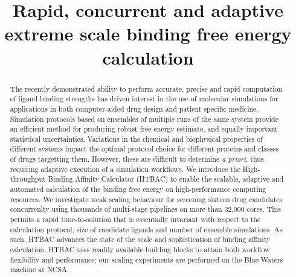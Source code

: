 \documentclass{llncs}
\title{Rapid, concurrent and adaptive extreme scale binding free energy calculation}
\begin{document}
\maketitle





\begin{abstract}

The recently demonstrated ability to perform accurate, precise and rapid
computation of ligand binding strengths has driven interest in the use of
molecular simulations for applications in both computer-aided drug design and
patient specific medicine. Simulation protocols based on ensembles of multiple
runs of the same system provide an efficient method for producing robust free
energy estimate, and equally important statistical uncertainties. Variations
in the chemical and biophysical properties of different systems impact the
optimal protocol choice for different proteins and classes of drugs targetting
them. However, these are difficult to determine {\it a priori}, thus requiring
adaptive execution of a simulation workflows. We introduce the High-throughput
Binding Affinity Calculator (HTBAC) to enable the scalable, adaptive and
automated calculation of the binding free energy on high-performance computing
resources. We investigate weak scaling behaviour for screening sixteen drug
candidates concurrenlty using thousands of multi-stage pipelines on more than
32,000 cores. This permits a rapid time-to-solution that is essentially
invariant with respect to the calculation protocol, size of candidate ligands
and number of ensemble simulations. As such, HTBAC advances the state of the
scale and sophistication of binding affinity calculation. HTBAC uses readily
available building blocks to attain both workflow flexibility and performance;
our scaling experiments are performed on the Blue Waters machine at NCSA.

\end{abstract}


\end{document}
